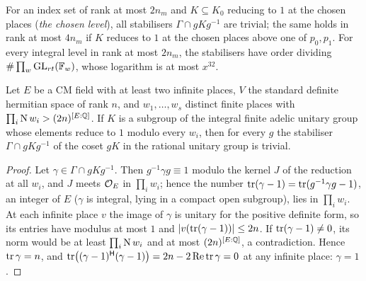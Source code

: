 \begin{proposition}\label{prop:free-levels}
For an index set of rank at most $2n_m$ and $K\subseteq K_0$ reducing to $1$ at the chosen places (\emph{the
chosen level}), all stabilisers $\Gamma\cap gKg^{-1}$ are trivial; the same holds in rank at most $4n_m$ if
$K$ reduces to $1$ at the chosen places above one of $p_0,p_1$. For every integral level in rank at most
$2n_m$, the stabilisers have order dividing $\#\prod_w\operatorname{GL}_{rt}(\mathbb{F}_w)$, whose logarithm is at most $x^{32}$.
\end{proposition}

\begin{lemma}\label{lem:minkowski-unitary}
Let $E$ be a CM field with at least two infinite places, $V$ the standard definite hermitian space of rank $n$, and $w_1,\dots,w_s$ distinct finite places with $\prod_i\operatorname{N} w_i>(2n)^{[E:\mathbb{Q}]}$. If $K$ is a subgroup of the integral finite adelic unitary group whose elements reduce to $1$ modulo every $w_i$, then for every $g$ the stabiliser
$\Gamma\cap gKg^{-1}$ of the coset $gK$ in the rational unitary group is trivial.
\end{lemma}

\begin{proof}
Let $\gamma\in\Gamma\cap gKg^{-1}$. Then $g^{-1}\gamma g\equiv1$ modulo the kernel $J$ of the reduction at all $w_i$, and $J$ meets $\mathcal{O}_E$ in $\prod_iw_i$; hence the number $\operatorname{tr}(\gamma-1)=\operatorname{tr}(g^{-1}\gamma g-1)$, an integer of $E$ ($\gamma$ is integral, lying in a compact open subgroup), lies in $\prod_iw_i$. At each infinite place $v$ the image of $\gamma$ is
unitary for the positive definite form, so its entries have modulus at most $1$ and $\lvert v(\operatorname{tr}(\gamma-1))\rvert\le2n$. If $\operatorname{tr}(\gamma-1)\ne0$, its norm would be at least $\prod_i\operatorname{N} w_i$ and at most $(2n)^{[E:\mathbb{Q}]}$, a contradiction. Hence $\operatorname{tr}\gamma=n$, and $\operatorname{tr}\bigl((\gamma-1)^{\mathsf H}(\gamma-1)\bigr)=2n-2\operatorname{Re}\operatorname{tr}\gamma=0$ at any infinite place: $\gamma=1$.
\end{proof}

